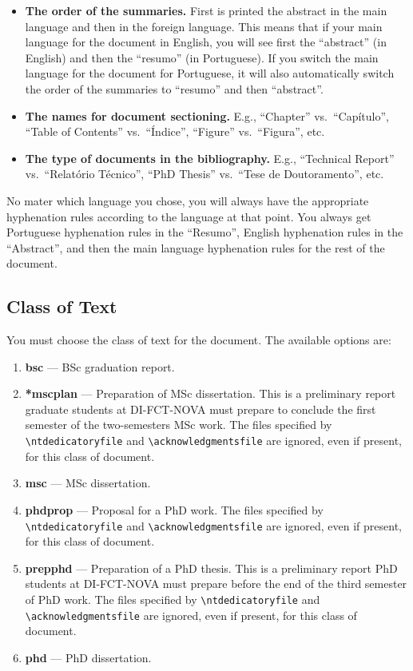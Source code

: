 {\begin{itemize}
  \item \textbf{The order of the summaries.} First is printed the abstract in the main language and then in the foreign language. This means that if your main language for the document in English, you will see first the “abstract” (in English) and then the “resumo” (in Portuguese). If you switch the main language for the document for Portuguese, it will also automatically switch the order of the summaries to “resumo” and then “abstract”.
  \item \textbf{The names for document sectioning.} E.g., ``Chapter'' vs.\ ``Capítulo'', ``Table of Contents'' vs.\ ``Índice'', ``Figure'' vs.\ ``Figura'', etc.
  \item \textbf{The type of documents in the bibliography.} E.g., ``Technical Report'' vs.\ ``Relatório Técnico'', ``PhD Thesis'' vs.\ ``Tese de Doutoramento'', etc.
\end{itemize}

No mater which language you chose, you will always have the appropriate hyphenation rules according to the language at that point. You always get Portuguese hyphenation rules in the ``Resumo'', English hyphenation rules in the ``Abstract'', and then the main language hyphenation rules for the rest of the document.




\subsection{Class of Text}
\label{sub:class_of_text}

You must choose the class of text for the document. The available options are:

\begin{enumerate}
  \item \textbf{bsc} --- BSc graduation report.
  \item \textbf{*mscplan} --- Preparation of MSc dissertation. This is a preliminary report graduate students at DI-FCT-NOVA must prepare to conclude the first semester of the two-semesters MSc work. The files specified by \verb!\ntdedicatoryfile! and \verb!\acknowledgmentsfile! are ignored, even if present, for this class of document.
  \item \textbf{msc} --- MSc dissertation.
  \item \textbf{phdprop} ---  Proposal for a PhD work. The files specified by \verb!\ntdedicatoryfile! and \verb!\acknowledgmentsfile! are ignored, even if present, for this class of document.
  \item \textbf{prepphd} ---  Preparation of a PhD thesis. This is a preliminary report PhD students at DI-FCT-NOVA must prepare before the end of the third semester of PhD work. The files specified by \verb!\ntdedicatoryfile! and \verb!\acknowledgmentsfile! are ignored, even if present, for this class of document.
  \item \textbf{phd} --- PhD dissertation.
\end{enumerate}

}
